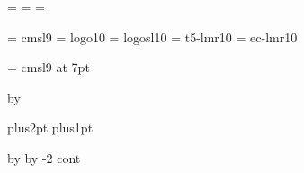 % 






\TUBfinal

\headmargin=\normalheadmargin
\rheadlgt=\normalrheadlgt
\collgt=\normalcollgt
\resetpagelgt

\let\runhead=\normalrunhead
\let\runfoot=\normalrunfoot

\iftrue %
\tenpoint\baselineskip=12.2pt
  \font\slnine = cmsl9
  \font\manual = logo10
  \font\manualsl = logosl10
  \font\thanhfont = t5-lmr10
  \font\lslashfont = ec-lmr10
\fi

\font\slc = cmsl9 at 7pt  %

\LoadSansFonts
\Trimmarkstrue
\NoBlackBoxes
\def\rtitle{}

\vfuzz=34pt 			%
  \advance\vsize by \vfuzz

\secskipa=4.0pt plus2pt       %
\secskipb=1.0pt plus1pt       %

% 
{
 \hfuzz=2pc                     %
 \advance\hsize by \hfuzz
 \advance\voffset by -2\baselineskip %
 \Input cont
}
\bye %
